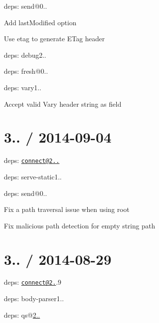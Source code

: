 \begin{DoxyItemize}
\item deps\+: send@0..
\begin{DoxyItemize}
\item Add {\ttfamily last\+Modified} option
\item Use {\ttfamily etag} to generate {\ttfamily E\+Tag} header
\item deps\+: debug2..
\item deps\+: fresh@0..
\end{DoxyItemize}
\item deps\+: vary1..
\begin{DoxyItemize}
\item Accept valid {\ttfamily Vary} header string as {\ttfamily field}
\end{DoxyItemize}
\end{DoxyItemize}

\section*{3.. / 2014-\/09-\/04 }


\begin{DoxyItemize}
\item deps\+: \href{mailto:connect@2.25.10}{\tt connect@2..}
\begin{DoxyItemize}
\item deps\+: serve-\/static1..
\end{DoxyItemize}
\item deps\+: send@0..
\begin{DoxyItemize}
\item Fix a path traversal issue when using {\ttfamily root}
\item Fix malicious path detection for empty string path
\end{DoxyItemize}
\end{DoxyItemize}

\section*{3.. / 2014-\/08-\/29 }


\begin{DoxyItemize}
\item deps\+: \href{mailto:connect@2.25}{\tt connect@2.}.9
\begin{DoxyItemize}
\item deps\+: body-\/parser1..
\item deps\+: qs@\hyperlink{namespace2_1_12_1_12}{2..}
\end{DoxyItemize}
\end{DoxyItemize}

